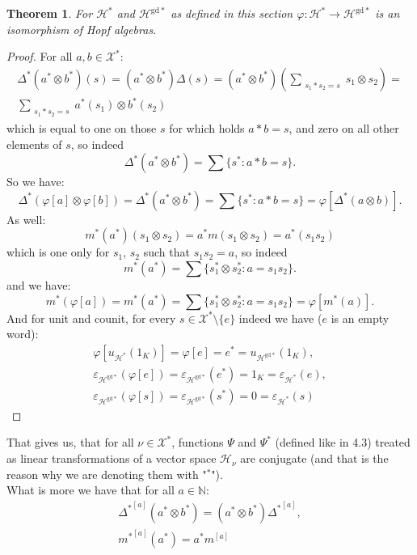 \documentclass[a4paper, 12pt]{article}
\newtheorem{theorem}{Theorem}
\newcommand{\gdd}[1]{#1^{\mathrm{gd}*}}
\begin{document}
\begin{theorem}
    For $\mathcal{H}^*$ and $\gdd{\mathcal{H}}$ as defined in this section $\varphi : \mathcal{H}^* \to
    \gdd{\mathcal{H}}$ is an isomorphism of Hopf algebras.
\end{theorem}
\begin{proof}
For all $a, b \in \mathcal{X}^*$:
\begin{gather*}
\Delta^*(a^* \otimes b^*)(s) = (a^* \otimes b^*)\Delta(s) =
(a^* \otimes b^*)\left(\sum_{\substack{s_1*s_2=s}} s_1 \otimes s_2 \right)=\\
\sum_{\substack{s_1*s_2=s}} a^*(s_1) \otimes b^*(s_2)
\end{gather*}
which is equal to one on those $s$ for which holds $a*b=s$, and zero on all other elements
of $s$, so indeed
\[
\Delta^*(a^* \otimes b^*) =
\sum\{s^* : a*b = s\}.
\]
So we have:
\[
\Delta^*(\varphi[a]\otimes \varphi[b]) = \Delta^*(a^* \otimes b^*) =
\sum\{s^* : a*b = s\} = \varphi\left[\Delta^*(a \otimes b)\right].
\]
As well:
\begin{equation*}
    m^*(a^*)(s_1 \otimes s_2) = a^*m(s_1 \otimes s_2) =
    a^*(s_1s_2)
\end{equation*}
which is one only for $s_1$, $s_2$ such that $s_1s_2 = a$, so indeed
\[
m^*(a^*) = \sum\{ s_1^* \otimes s_2^* : a=s_1s_2 \}.
\]
and we have:
\[
m^*(\varphi[a]) = m^*(a^*) = \sum\{ s_1^* \otimes s_2^* : a=s_1s_2 \} = \varphi[m^*(a)].
\]
And for unit and counit, for every $s \in \mathcal{X}^* \setminus \{e\}$
indeed we have ($e$ is an empty word):
\begin{gather*}
\varphi[u_{\mathcal{H}^*}(1_K)] = \varphi[e] =  e^* =u_{\mathcal{\gdd{\mathcal{H}}}}(1_K), \\
\varepsilon_{\gdd{\mathcal{H}}}(\varphi[e]) =
\varepsilon_{\gdd{\mathcal{H}}}(e^*) = 1_K =
\varepsilon_{\mathcal{H}^*}(e), \\
\varepsilon_{\gdd{\mathcal{H}}}(\varphi[s]) =
\varepsilon_{\gdd{\mathcal{H}}}(s^*) = 0 =
\varepsilon_{\mathcal{H}^*}(s)
\end{gather*}
\end{proof}
That gives us, that for all $\nu \in \mathcal{X}^*$, functions $\Psi$
and $\Psi^*$ (defined like in 4.3) treated as linear transformations of a vector space $\mathcal{H}_\nu$
are conjugate
(and that is the reason why we are denoting them with "$^*$"). \\
What is more we have that for all $a \in \mathbb{N}$:
\begin{gather*}
    {\Delta^*}^{[a]}(a^* \otimes b^*) = (a^* \otimes b^*){\Delta^*}^{[a]}, \\
    {m^*}^{[a]}(a^*)=a^*m^{[a]}
\end{gather*}
\end{document}

